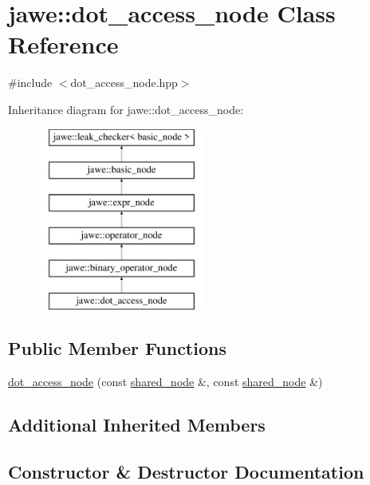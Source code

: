 \hypertarget{classjawe_1_1dot__access__node}{}\section{jawe\+:\+:dot\+\_\+access\+\_\+node Class Reference}
\label{classjawe_1_1dot__access__node}


{\ttfamily \#include $<$dot\+\_\+access\+\_\+node.\+hpp$>$}

Inheritance diagram for jawe\+:\+:dot\+\_\+access\+\_\+node\+:\begin{figure}[H]
\begin{center}
\leavevmode
\includegraphics[height=6.000000cm]{classjawe_1_1dot__access__node}
\end{center}
\end{figure}
\subsection*{Public Member Functions}
\begin{DoxyCompactItemize}
\item 
\hyperlink{classjawe_1_1dot__access__node_a37f230071af08407536141fa8dc65f59}{dot\+\_\+access\+\_\+node} (const \hyperlink{namespacejawe_a3f307481d921b6cbb50cc8511fc2b544}{shared\+\_\+node} \&, const \hyperlink{namespacejawe_a3f307481d921b6cbb50cc8511fc2b544}{shared\+\_\+node} \&)
\end{DoxyCompactItemize}
\subsection*{Additional Inherited Members}


\subsection{Constructor \& Destructor Documentation}
\mbox{\label{classjawe_1_1dot__access__node_a37f230071af08407536141fa8dc65f59}} 
